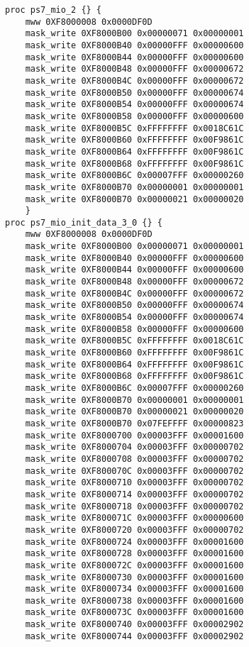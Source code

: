 \begin{lstlisting}
proc ps7_mio_2 {} {
    mww 0XF8000008 0x0000DF0D
    mask_write 0XF8000B00 0x00000071 0x00000001
    mask_write 0XF8000B40 0x00000FFF 0x00000600
    mask_write 0XF8000B44 0x00000FFF 0x00000600
    mask_write 0XF8000B48 0x00000FFF 0x00000672
    mask_write 0XF8000B4C 0x00000FFF 0x00000672
    mask_write 0XF8000B50 0x00000FFF 0x00000674
    mask_write 0XF8000B54 0x00000FFF 0x00000674
    mask_write 0XF8000B58 0x00000FFF 0x00000600
    mask_write 0XF8000B5C 0xFFFFFFFF 0x0018C61C
    mask_write 0XF8000B60 0xFFFFFFFF 0x00F9861C
    mask_write 0XF8000B64 0xFFFFFFFF 0x00F9861C
    mask_write 0XF8000B68 0xFFFFFFFF 0x00F9861C
    mask_write 0XF8000B6C 0x00007FFF 0x00000260
    mask_write 0XF8000B70 0x00000001 0x00000001
    mask_write 0XF8000B70 0x00000021 0x00000020
    }
proc ps7_mio_init_data_3_0 {} {
	mww 0XF8000008 0x0000DF0D
    mask_write 0XF8000B00 0x00000071 0x00000001
    mask_write 0XF8000B40 0x00000FFF 0x00000600
    mask_write 0XF8000B44 0x00000FFF 0x00000600
    mask_write 0XF8000B48 0x00000FFF 0x00000672
    mask_write 0XF8000B4C 0x00000FFF 0x00000672
    mask_write 0XF8000B50 0x00000FFF 0x00000674
    mask_write 0XF8000B54 0x00000FFF 0x00000674
    mask_write 0XF8000B58 0x00000FFF 0x00000600
    mask_write 0XF8000B5C 0xFFFFFFFF 0x0018C61C
    mask_write 0XF8000B60 0xFFFFFFFF 0x00F9861C
    mask_write 0XF8000B64 0xFFFFFFFF 0x00F9861C
    mask_write 0XF8000B68 0xFFFFFFFF 0x00F9861C
    mask_write 0XF8000B6C 0x00007FFF 0x00000260
    mask_write 0XF8000B70 0x00000001 0x00000001
    mask_write 0XF8000B70 0x00000021 0x00000020
    mask_write 0XF8000B70 0x07FEFFFF 0x00000823
    mask_write 0XF8000700 0x00003FFF 0x00001600
    mask_write 0XF8000704 0x00003FFF 0x00000702
    mask_write 0XF8000708 0x00003FFF 0x00000702
    mask_write 0XF800070C 0x00003FFF 0x00000702
    mask_write 0XF8000710 0x00003FFF 0x00000702
    mask_write 0XF8000714 0x00003FFF 0x00000702
    mask_write 0XF8000718 0x00003FFF 0x00000702
    mask_write 0XF800071C 0x00003FFF 0x00000600
    mask_write 0XF8000720 0x00003FFF 0x00000702
    mask_write 0XF8000724 0x00003FFF 0x00001600
    mask_write 0XF8000728 0x00003FFF 0x00001600
    mask_write 0XF800072C 0x00003FFF 0x00001600
    mask_write 0XF8000730 0x00003FFF 0x00001600
    mask_write 0XF8000734 0x00003FFF 0x00001600
    mask_write 0XF8000738 0x00003FFF 0x00001600
    mask_write 0XF800073C 0x00003FFF 0x00001600
    mask_write 0XF8000740 0x00003FFF 0x00002902
    mask_write 0XF8000744 0x00003FFF 0x00002902


\end{lstlisting}
